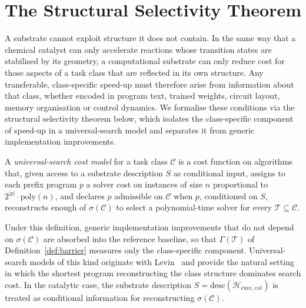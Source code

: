 \documentclass[runningheads]{llncs}
\newcommand{\Hw}{\mathcal{H}}
\newcommand{\Task}{\mathcal{T}}
\newcommand{\Class}{\mathcal{C}}
\newcommand{\descop}{\mathrm{desc}}
\newcommand{\poly}{\mathrm{poly}}
\begin{document}
\section{The Structural Selectivity Theorem}
\label{sec:selectivity}

A substrate cannot exploit structure it does not contain. In the same
way that a chemical catalyst can only accelerate reactions whose
transition states are stabilised by its geometry, a computational
substrate can only reduce cost for those aspects of a task class that
are reflected in its own structure. Any transferable, class-specific
speed-up must therefore arise from information about that class,
whether encoded in program text, trained weights, circuit layout,
memory organisation or control dynamics. We formalise these conditions via the structural selectivity theorem below, which isolates the
class-specific component of speed-up in a universal-search model and
separates it from generic implementation improvements.

\begin{definition}
\label{def:search-model}
A \emph{universal-search cost model} for a task class $\Class$ is a
cost function on algorithms that, given access to a substrate
description $S$ as conditional input, assigns to each prefix program
$p$ a solver cost on instances of size $n$ proportional to
$2^{|p|}\cdot\poly(n)$, and declares $p$ admissible on $\Class$
when $p$, conditioned on $S$, reconstructs enough of $\sigma(\Class)$
to select a polynomial-time solver for every
$\Task\subseteq\Class$. 
\end{definition}
Under this definition, generic implementation improvements that do
not depend on $\sigma(\Class)$ are absorbed into the reference
baseline, so that $\Gamma(\Task)$ of Definition~\ref{def:barrier}
measures only the class-specific component. Universal-search models of this kind originate with
Levin~\cite{levin1984randomness} and provide the natural setting in
which the shortest program reconstructing the class structure
dominates search cost. In the catalytic case, the substrate description
\(S=\descop(\Hw_{\mathrm{exec,cat}})\) is treated as conditional
information for reconstructing \(\sigma(\Class)\).
\end{document}
